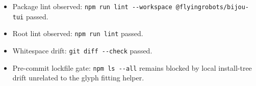 \begin{itemize}
  GREEN observed: \texttt{n\allowbreak{}p\allowbreak{}m\allowbreak{} \allowbreak{}r\allowbreak{}u\allowbreak{}n\allowbreak{} \allowbreak{}t\allowbreak{}e\allowbreak{}s\allowbreak{}t\allowbreak{} \allowbreak{}-\allowbreak{}-\allowbreak{} \allowbreak{}p\allowbreak{}a\allowbreak{}c\allowbreak{}k\allowbreak{}a\allowbreak{}g\allowbreak{}e\allowbreak{}s\allowbreak{}/\allowbreak{}b\allowbreak{}i\allowbreak{}j\allowbreak{}o\allowbreak{}u\allowbreak{}-\allowbreak{}t\allowbreak{}u\allowbreak{}i\allowbreak{}/\allowbreak{}s\allowbreak{}r\allowbreak{}c\allowbreak{}/\allowbreak{}c\allowbreak{}e\allowbreak{}l\allowbreak{}l\allowbreak{}-\allowbreak{}g\allowbreak{}l\allowbreak{}y\allowbreak{}p\allowbreak{}h\allowbreak{}-\allowbreak{}f\allowbreak{}i\allowbreak{}t\allowbreak{}.\allowbreak{}t\allowbreak{}e\allowbreak{}s\allowbreak{}t\allowbreak{}.\allowbreak{}t\allowbreak{}s\allowbreak{} \allowbreak{}p\allowbreak{}a\allowbreak{}c\allowbreak{}k\allowbreak{}a\allowbreak{}g\allowbreak{}e\allowbreak{}s\allowbreak{}/\allowbreak{}b\allowbreak{}i\allowbreak{}j\allowbreak{}o\allowbreak{}u\allowbreak{}-\allowbreak{}t\allowbreak{}u\allowbreak{}i\allowbreak{}/\allowbreak{}s\allowbreak{}r\allowbreak{}c\allowbreak{}/\allowbreak{}i\allowbreak{}n\allowbreak{}d\allowbreak{}e\allowbreak{}x\allowbreak{}.\allowbreak{}t\allowbreak{}e\allowbreak{}s\allowbreak{}t\allowbreak{}.\allowbreak{}t\allowbreak{}s} passed with 9 tests.
\item
  Package lint observed: \texttt{n\allowbreak{}p\allowbreak{}m\allowbreak{} \allowbreak{}r\allowbreak{}u\allowbreak{}n\allowbreak{} \allowbreak{}l\allowbreak{}i\allowbreak{}n\allowbreak{}t\allowbreak{} \allowbreak{}-\allowbreak{}-\allowbreak{}w\allowbreak{}o\allowbreak{}r\allowbreak{}k\allowbreak{}s\allowbreak{}p\allowbreak{}a\allowbreak{}c\allowbreak{}e\allowbreak{} \allowbreak{}@\allowbreak{}f\allowbreak{}l\allowbreak{}y\allowbreak{}i\allowbreak{}n\allowbreak{}g\allowbreak{}r\allowbreak{}o\allowbreak{}b\allowbreak{}o\allowbreak{}t\allowbreak{}s\allowbreak{}/\allowbreak{}b\allowbreak{}i\allowbreak{}j\allowbreak{}o\allowbreak{}u\allowbreak{}-\allowbreak{}t\allowbreak{}u\allowbreak{}i} passed.
\item
  Root lint observed: \texttt{n\allowbreak{}p\allowbreak{}m\allowbreak{} \allowbreak{}r\allowbreak{}u\allowbreak{}n\allowbreak{} \allowbreak{}l\allowbreak{}i\allowbreak{}n\allowbreak{}t} passed.
\item
  Whitespace drift: \texttt{g\allowbreak{}i\allowbreak{}t\allowbreak{} \allowbreak{}d\allowbreak{}i\allowbreak{}f\allowbreak{}f\allowbreak{} \allowbreak{}-\allowbreak{}-\allowbreak{}c\allowbreak{}h\allowbreak{}e\allowbreak{}c\allowbreak{}k} passed.
\item
  Pre-commit lockfile gate: \texttt{n\allowbreak{}p\allowbreak{}m\allowbreak{} \allowbreak{}l\allowbreak{}s\allowbreak{} \allowbreak{}-\allowbreak{}-\allowbreak{}a\allowbreak{}l\allowbreak{}l} remains blocked by local install-tree drift unrelated to the glyph fitting helper.
\end{itemize}

